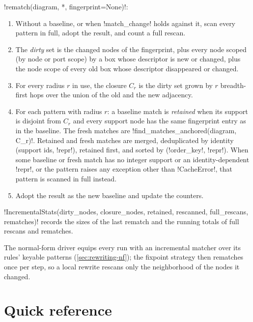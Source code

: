 \begin{algorithm}\label{alg:rewriting-rematch}
\py!rematch(diagram, *, fingerprint=None)!:
\begin{enumerate}
\item Without a baseline, or when \py!match_change! holds against it, scan every pattern in full,
  adopt the result, and count a full rescan.
\item The \emph{dirty} set is the changed nodes of the fingerprint, plus every node scoped (by node
  or port scope) by a box whose descriptor is new or changed, plus the node scope of every old box
  whose descriptor disappeared or changed.
\item For every radius $r$ in use, the closure $C_r$ is the dirty set grown by $r$ breadth-first hops
  over the union of the old and the new adjacency.
\item For each pattern with radius $r$: a baseline match is \emph{retained} when its support is
  disjoint from $C_r$ and every support node has the same fingerprint entry as in the baseline. The
  fresh matches are \py!find_matches_anchored(diagram, C_r)!. Retained and fresh matches are merged,
  deduplicated by identity (support ids, \py!repr!), retained first, and sorted by
  (\py!order_key!, \py!repr!). When some baseline or fresh match has no integer support or an
  identity-dependent \py!repr!, or the pattern raises any exception other than \py!CacheError!, that
  pattern is scanned in full instead.
\item Adopt the result as the new baseline and update the counters.
\end{enumerate}
\end{algorithm}
\py!IncrementalStats(dirty_nodes, closure_nodes, retained, rescanned, full_rescans, rematches)!
records the sizes of the last rematch and the running totals of full rescans and rematches.

The normal-form driver equips every run with an incremental matcher over its rules' keyable
patterns (\cref{sec:rewriting-nf}); the fixpoint strategy then rematches once per step, so a local
rewrite rescans only the neighborhood of the nodes it changed.

\section{Quick reference}\label{sec:rewriting-quickref}

